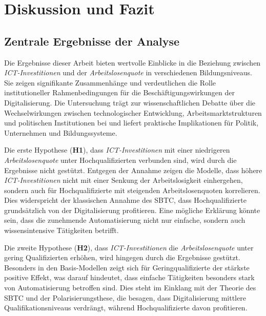 \section{Diskussion und Fazit}


\subsection{Zentrale Ergebnisse der Analyse}

Die Ergebnisse dieser Arbeit bieten wertvolle Einblicke in die Beziehung zwischen 
\textit{\ac{ICT}-Investitionen} und der \textit{Arbeitslosenquote} in verschiedenen 
Bildungsniveaus. Sie zeigen signifikante Zusammenhänge und verdeutlichen die Rolle 
institutioneller Rahmenbedingungen für die Beschäftigungswirkungen der Digitalisierung. Die 
Untersuchung trägt zur wissenschaftlichen Debatte über die Wechselwirkungen zwischen 
technologischer Entwicklung, Arbeitsmarktstrukturen und politischen Institutionen bei und liefert 
praktische Implikationen für Politik, Unternehmen und Bildungssysteme. 

Die erste Hypothese (\textbf{H1}), dass \textit{\ac{ICT}-Investitionen} mit einer niedrigeren 
\textit{Arbeitslosenquote} unter Hochqualifizierten verbunden sind, wird durch die Ergebnisse 
nicht gestützt. Entgegen der Annahme zeigen die Modelle, dass höhere 
\textit{\ac{ICT}-Investitionen} nicht mit einer Senkung der Arbeitslosigkeit einhergehen, sondern 
auch für Hochqualifizierte mit steigenden Arbeitslosenquoten korrelieren. Dies widerspricht der 
klassischen Annahme des \ac{SBTC}, dass Hochqualifizierte grundsätzlich von der Digitalisierung 
profitieren. Eine mögliche Erklärung könnte sein, dass die zunehmende Automatisierung nicht nur 
einfache, sondern auch wissensintensive Tätigkeiten betrifft. 

Die zweite Hypothese (\textbf{H2}), dass \textit{\ac{ICT}-Investitionen} die 
\textit{Arbeitslosenquote} unter gering Qualifizierten erhöhen, wird hingegen durch die 
Ergebnisse gestützt. Besonders in den Basis-Modellen zeigt sich für Geringqualifizierte der 
stärkste positive Effekt, was darauf hindeutet, dass einfache Tätigkeiten besonders stark von 
Automatisierung betroffen sind. Dies steht im Einklang mit der Theorie des \ac{SBTC} und der 
Polarisierungsthese, die besagen, dass Digitalisierung mittlere Qualifikationsniveaus verdrängt, 
während Hochqualifizierte davon profitieren.


